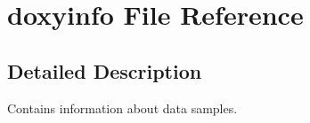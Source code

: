 \section{doxyinfo File Reference}
\label{doxyinfo}


\subsection{Detailed Description}
Contains information about data samples. 